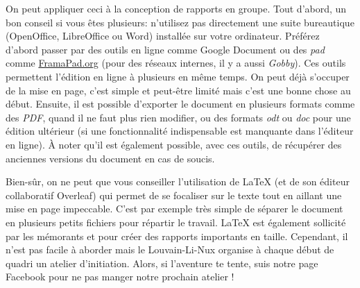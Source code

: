 \documentclass[10pt]{../fiche}
\begin{document}
On peut appliquer ceci à la conception de rapports en groupe. Tout d'abord, un bon conseil si vous êtes plusieurs: n'utilisez pas directement une suite bureautique (OpenOffice, LibreOffice ou Word) installée sur votre ordinateur. Préférez d'abord passer par des outils en ligne comme Google Document ou des \textit{pad} comme \url{FramaPad.org} (pour des réseaux internes, il y a aussi \textit{Gobby}). Ces outils permettent l'édition en ligne à plusieurs en même temps. On peut déjà s'occuper de la mise en page, c'est simple et peut-être limité mais c'est une bonne chose au début. Ensuite, il est possible d'exporter le document en plusieurs formats comme des \textit{PDF}, quand il ne faut plus rien modifier, ou des formats \textit{odt} ou \textit{doc} pour une édition ultérieur (si une fonctionnalité indispensable est manquante dans l'éditeur en ligne). À noter qu'il est également possible, avec ces outils, de récupérer des anciennes versions du document en cas de soucis.

Bien-sûr, on ne peut que vous conseiller l'utilisation de \LaTeX{} (et de son éditeur collaboratif Overleaf) qui permet de se focaliser sur le texte tout en aillant une mise en page impeccable. C'est par exemple très simple de séparer le document en plusieurs petits fichiers pour répartir le travail. \LaTeX{} est également sollicité par les mémorants et pour créer des rapports importants en taille. Cependant, il n'est pas facile à aborder mais le Louvain-Li-Nux organise à chaque début de quadri un atelier d'initiation.	Alors, si l'aventure te tente, suis notre page Facebook pour ne pas manger notre prochain atelier !
\end{document}
